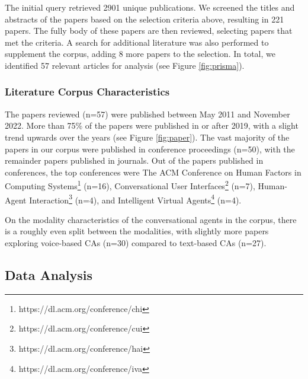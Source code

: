 The initial query retrieved 2901 unique publications. We screened the titles and abstracts of the papers based on the selection criteria above, resulting in 221 papers. The fully body of these papers are then reviewed, selecting papers that met the criteria. A search for additional literature was also performed to supplement the corpus, adding 8 more papers to the selection. In total, we identified 57 relevant articles for analysis (see Figure \ref{fig:prisma}).



\subsubsection*{Literature Corpus Characteristics}

The papers reviewed (n=57) were published between May 2011 and November 2022. More than 75\% of the papers were published in or after 2019, with a slight trend upwards over the years (see Figure \ref{fig:paper}). The vast majority of the papers in our corpus were published in conference proceedings (n=50), with the remainder papers published in journals. Out of the papers published in conferences, the top conferences were The ACM Conference on Human Factors in Computing Systems\footnote{https://dl.acm.org/conference/chi} (n=16), Conversational User Interfaces\footnote{https://dl.acm.org/conference/cui} (n=7), Human-Agent Interaction\footnote{https://dl.acm.org/conference/hai} (n=4), and Intelligent Virtual Agents\footnote{https://dl.acm.org/conference/iva} (n=4). 

On the modality characteristics of the conversational agents in the corpus, there is a roughly even split between the modalities, with slightly more papers exploring voice-based CAs (n=30) compared to text-based CAs (n=27).



\subsection{Data Analysis}

